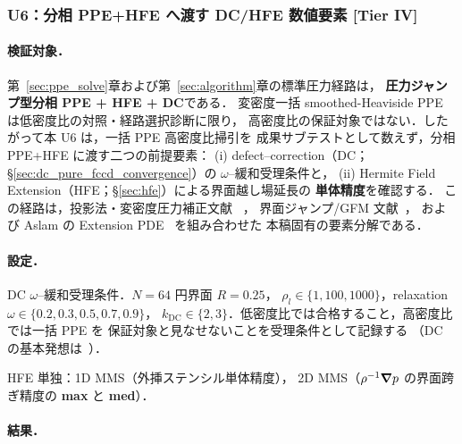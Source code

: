 %
\subsubsection{U6：分相 PPE+HFE へ渡す DC/HFE 数値要素 [Tier IV]}
\label{sec:U6_split_ppe_dc_hfe}
\label{sec:varrho_ppe_limitation}%

\paragraph{検証対象．}
第~\ref{sec:ppe_solve}章および第~\ref{sec:algorithm}章の標準圧力経路は，
\textbf{圧力ジャンプ型分相 PPE + HFE + DC}である．
変密度一括 smoothed-Heaviside PPE は低密度比の対照・経路選択診断に限り，
高密度比の保証対象ではない．したがって本 U6 は，一括 PPE 高密度比掃引を
成果サブテストとして数えず，分相 PPE+HFE に渡す二つの前提要素：
(i) defect--correction（DC；§\ref{sec:dc_pure_fccd_convergence}）の
$\omega$--緩和受理条件と，
(ii) Hermite Field Extension（HFE；§\ref{sec:hfe}）による界面越し場延長の
\textbf{単体精度}を確認する．
この経路は，投影法・変密度圧力補正文献
~\cite{Guermond2006,GuermondQuartapelle1998,PyoShen2007}，
界面ジャンプ/GFM 文献~\cite{Fedkiw1999,Kang2000,LeVequeLi1994}，
および Aslam の Extension PDE~\cite{Aslam2004} を組み合わせた
本稿固有の要素分解である．

\paragraph{設定．}
\begin{description}\setlength{\itemsep}{0pt}
  \item[U6-a] DC $\omega$--緩和受理条件．$N=64$ 円界面 $R=0.25$，
        $\rho_l \in \{1, 100, 1000\}$，relaxation $\omega \in \{0.2,0.3,0.5,0.7,0.9\}$，
        $k_{\mathrm{DC}} \in \{2,3\}$．低密度比では合格すること，高密度比では一括 PPE を
        保証対象と見なせないことを受理条件として記録する
        （DC の基本発想は~\cite{Stetter1978,Kelley2003}）．
  \item[U6-b] HFE 単独：1D MMS（外挿ステンシル単体精度），
        2D MMS（$\rho^{-1}\bm{\nabla} p$ の界面跨ぎ精度の \textbf{max} と \textbf{med}）．
\end{description}

\paragraph{結果．}

